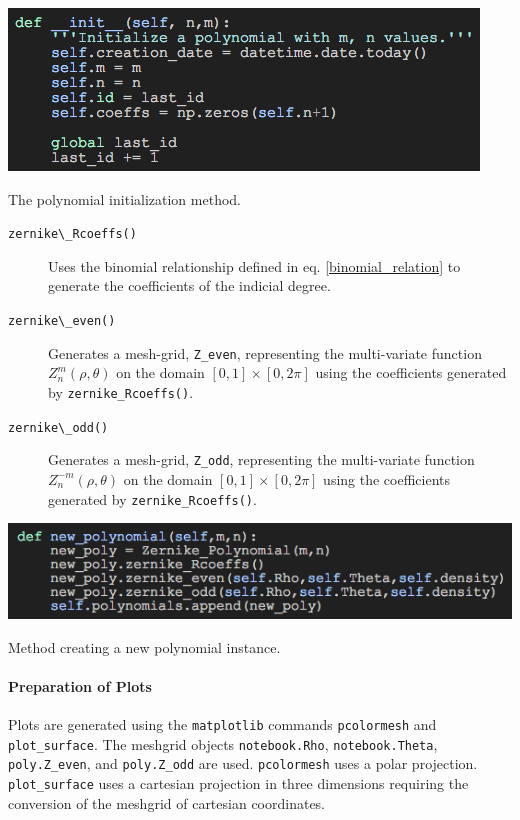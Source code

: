 \documentclass{tufte-handout}
\begin{document}
\begin{marginfigure}%
  \includegraphics[width=\linewidth]{img/init.png}
  \caption{The polynomial initialization method.}
  \label{fig:init}
\end{marginfigure}

\begin{description}
\item[\Verb|zernike\_Rcoeffs()|] Uses the binomial relationship defined in eq. \ref{binomial_relation} to generate the coefficients of the indicial degree.
\item[\Verb|zernike\_even()|] Generates a mesh-grid, \Verb|Z_even|, representing the multi-variate function $Z_n^m(\rho,\theta)$ on the domain $[0, 1] \times [0, 2\pi]$ using the coefficients generated by \Verb|zernike_Rcoeffs()|.
\item[\Verb|zernike\_odd()|] Generates a mesh-grid, \Verb|Z_odd|, representing the multi-variate function $Z_n^{-m}(\rho,\theta)$ on the domain $[0, 1] \times [0, 2\pi]$ using the coefficients generated by \Verb|zernike_Rcoeffs()|.
\end{description}

\begin{marginfigure}%
  \includegraphics[width=\linewidth]{img/new_poly.png}
  \caption{Method creating a new polynomial instance.}
  \label{fig:init}
\end{marginfigure}

\paragraph{Preparation of Plots}
Plots are generated using the \Verb|matplotlib| commands \Verb|pcolormesh| and \Verb|plot_surface|. The meshgrid objects \Verb|notebook.Rho|, \Verb|notebook.Theta|, \Verb|poly.Z_even|, and \Verb|poly.Z_odd| are used. \Verb|pcolormesh| uses a polar projection. \Verb|plot_surface| uses a cartesian projection in three dimensions requiring the conversion of the meshgrid of cartesian coordinates.
\end{document}
